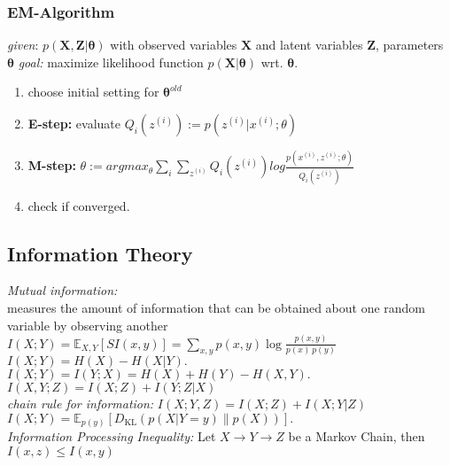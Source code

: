\documentclass[9pt,parskip]{scrartcl}
\begin{document}
\begin{multicols*}{4}
\subsubsection*{EM-Algorithm}
\textit{given}: $p(\mathbf{X},\mathbf{Z}|\mathbf{\theta})$ with observed variables $\mathbf{X}$ and latent variables $\mathbf{Z}$, parameters $\mathbf{\theta}$
\textit{goal:} maximize likelihood function $p(\mathbf{X}|\mathbf{\theta})$ wrt. $\mathbf{\theta}$.
\begin{enumerate}
	\item choose initial setting for $\boldsymbol{\theta}^{old}$
	\item \textbf{E-step:} evaluate 
	$Q_i(z^{(i)}) := p(z^{(i)}|x^{(i)};\theta)$
	\item \textbf{M-step:} 
	$\theta := argmax_{\theta} \sum_i \sum_{z^{(i)}} Q_i(z^{(i)})log\frac{p(x^{(i)},z^{(i)};\theta)}{Q_i(z^{(i)})}$ 
	\item check if converged.
\end{enumerate}

\subsection*{Information Theory}
\textit{Mutual information: } \\
measures the amount of information that can be obtained about one random variable by observing another \\
$I(X;Y)=\mathbb {E} _{X,Y}[SI(x,y)]=\sum _{x,y}p(x,y)\log {\frac {p(x,y)}{p(x)\,p(y)}}$ \\
$I(X;Y)=H(X)-H(X|Y).\,$ \\
$I(X;Y)=I(Y;X)=H(X)+H(Y)-H(X,Y).\,$ \\
$I(X,Y;Z) = I(X;Z) + I(Y;Z|X)$\\
\textit{chain rule for information: }$I(X;Y,Z)=I(X;Z)+I(X;Y|Z)$ \\
$I(X;Y)=\mathbb {E} _{p(y)}[D_{\mathrm {KL} }(p(X|Y=y)\|p(X))].$ \\
\textit{Information Processing Inequality: } Let $X \rightarrow Y \rightarrow Z$ be a Markov Chain, then $I(x,z) \leq I(x,y)$

\end{multicols*}
\end{document}
